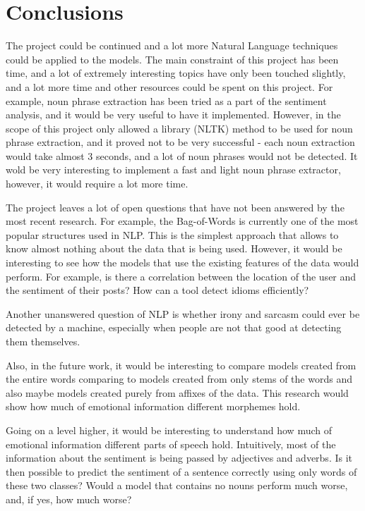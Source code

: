 \let\textcircled=\pgftextcircled
\chapter{Conclusions}
\label{chap:conclusions}

\par The project could be continued and a lot more Natural Language techniques could be applied to the models. The main constraint of this project has been time, and a lot of extremely interesting topics have only been touched slightly, and a lot more time and other resources could be spent on this project. For example, noun phrase extraction has been tried as a part of the sentiment analysis, and it would be very useful to have it implemented. However, in the scope of this project only allowed a library (NLTK) method to be used for noun phrase extraction, and it proved not to be very successful - each noun extraction would take almost 3 seconds, and a lot of noun phrases would not be detected. It wold be very interesting to implement a fast and light noun phrase extractor, however, it would require a lot more time. 

The project leaves a lot of open questions that have not been answered by the most recent research. For example, the Bag-of-Words is currently one of the most popular structures used in NLP. This is the simplest approach that allows to know almost nothing about the data that is being used. However, it would be interesting to see how the models that use the existing features of the data would perform. For example, is there a correlation between the location of the user and the sentiment of their posts? How can a tool detect idioms efficiently? 

Another unanswered question of NLP is whether irony and sarcasm could ever be detected by a machine, especially when people are not that good at detecting them themselves. 

Also, in the future work, it would be interesting to compare models created from the entire words comparing to models created from only stems of the words and also maybe models created purely from affixes of the data. This research would show how much of emotional information different morphemes hold.

Going on a level higher, it would be interesting to understand how much of emotional information different parts of speech hold. Intuitively, most of the information about the sentiment is being passed by adjectives and adverbs. Is it then possible to predict the sentiment of a sentence correctly using only words of these two classes? Would a model that contains no nouns perform much worse, and, if yes, how much worse?


